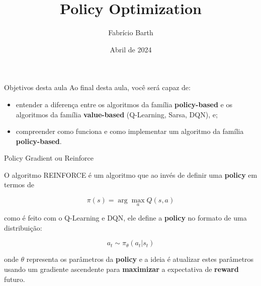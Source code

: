 \documentclass{beamer}
\begin{document}
	
\title{Policy Optimization} 
\author{Fabrício Barth}
\date{Abril de 2024}
	
\maketitle

\def\HiLi{\leavevmode\rlap{\hbox to \hsize{\color{yellow!50}\leaders\hrule height .8\baselineskip depth .5ex\hfill}}}
	
\begin{frame}{Objetivos desta aula}
	Ao final desta aula, você será capaz de: 
		
	\begin{itemize}
		\item entender a diferença entre os algoritmos da família \textbf{policy-based} e os algoritmos da família \textbf{value-based} (Q-Learning, Sarsa, DQN), e; 
		\item compreender como funciona e como implementar um algoritmo da família \textbf{policy-based}. 
	\end{itemize}
\end{frame}

\begin{frame}{Policy Gradient ou Reinforce}
	
	O algoritmo REINFORCE é um algoritmo que ao invés de definir uma \textbf{policy} em termos de 
	
	\begin{equation}
	\pi(s) = \arg \max_{a} Q(s,a)
	\end{equation}
	
	como é feito com o Q-Learning e DQN, ele define a \textbf{policy} no formato de uma distribuição: 
	
	\begin{equation}
	a_{t} \sim \pi_{\theta}(a_{t} | s_{t})
	\end{equation}	
	
	onde $\theta$ representa os parâmetros da \textbf{policy} e a ideia é atualizar estes parâmetros usando um gradiente ascendente para \textbf{maximizar} a expectativa de \textbf{reward} futuro.
\end{frame}
\end{document}
